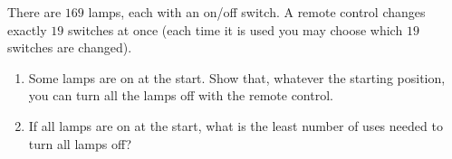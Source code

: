 There are $169$ lamps, each with an on/off switch. A remote control changes exactly $19$ switches at once (each time it is used you may choose which $19$ switches are changed).
\begin{enumerate}
\item[(a)] Some lamps are on at the start. Show that, whatever the starting position, you can turn all the lamps off with the remote control.
\item[(b)] If all lamps are on at the start, what is the least number of uses needed to turn all lamps off?
\end{enumerate}
